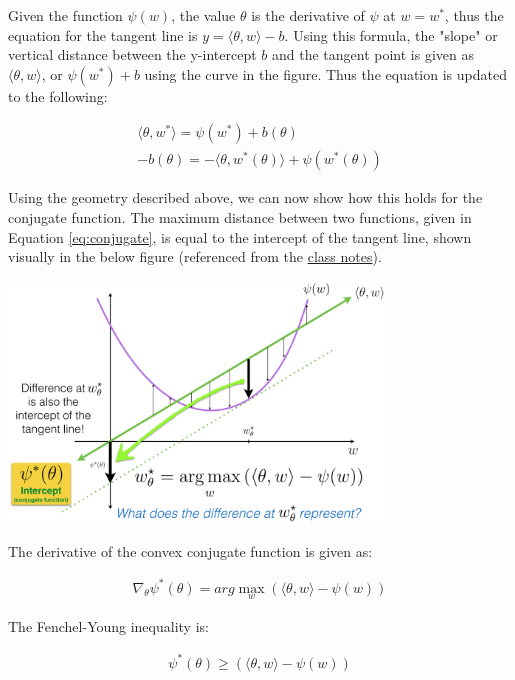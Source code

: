 \documentclass[11pt]{article}
\begin{document}
Given the function $\psi(w)$, the value $\theta$ is the derivative of $\psi$ at $w = w^*$, thus the equation for the tangent line is $y = \langle \theta, w \rangle - b$. Using this formula, the "slope" or vertical distance between the y-intercept $b$ and the tangent point is given as $\langle \theta, w \rangle$, or $\psi(w^*) + b$ using the curve in the figure. Thus the equation is updated to the following:

\begin{align}
    \langle \theta, w^* \rangle = \psi(w^*) + b(\theta) \\
    -b(\theta) = -\langle \theta, w^*(\theta) \rangle + \psi(w^*(\theta))
\end{align}

Using the geometry described above, we can now show how this holds for the conjugate function. The maximum distance between two functions, given in Equation \ref{eq:conjugate}, is equal to the intercept of the tangent line, shown visually in the below figure (referenced from the \href{https://www.dropbox.com/sh/j3cnwem4wo1u3bx/AADlFGyy7quBUsXrnQ3hda6La?dl=0&preview=L8+OMD-Duality.pdf}{class notes}). 

\begin{center}
    \includegraphics[width=10cm]{tangent-conjugate.png}
\end{center}

The derivative of the convex conjugate function is given as:

\begin{align}
    \nabla_\theta \psi^*(\theta) = arg\max_w (\langle \theta, w \rangle - \psi(w)) \label{eq:derivative_conjugate}
\end{align}

The Fenchel-Young inequality is:

\begin{align}
    \psi^*(\theta) \geq (\langle \theta, w \rangle - \psi(w)) \label{eq:fenchel_young}
\end{align}
\end{document}
